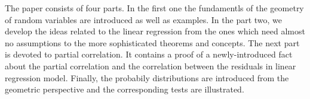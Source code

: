 \begin{fullwidth}
The paper consists of four parts. In the first one the fundamentls of the geometry
of random variables are introduced as well as examples.
In the part two, we develop the ideas related to the linear regression
from the ones which need almost no assumptions to the more sophisticated theorems
and concepts.
The next part is devoted to partial correlation. It contains a proof of
a newly-introduced fact about the partial correlation and the correlation
between the residuals in linear regression model.
Finally, the probabily distributions are introduced from the geometric perspective
and the corresponding tests are illustrated.

\end{fullwidth}
